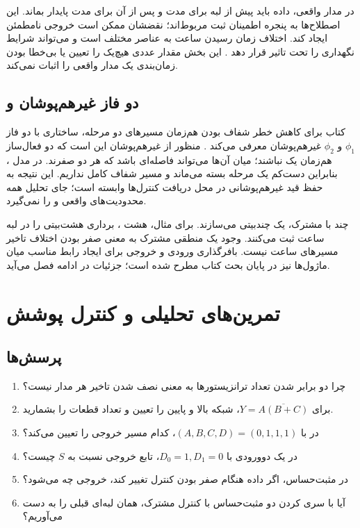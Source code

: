 در مدار واقعی، داده باید پیش از لبه برای مدت  و پس از آن برای
مدت  پایدار بماند. این اصطلاح‌ها به پنجره اطمینان ثبت مربوط‌اند؛
نقضشان ممکن است خروجی نامطمئن ایجاد کند.
 اختلاف زمان رسیدن ساعت به عناصر مختلف است و می‌تواند
شرایط نگهداری را تحت تاثیر قرار دهد \cite[ابتدای صفحه چاپی ۱۹]{weste}.
این بخش مقدار عددی هیچ‌یک را تعیین یا بی‌خطا بودن زمان‌بندی یک مدار واقعی را اثبات نمی‌کند.

\subsection{دو فاز غیرهم‌پوشان و }
کتاب برای کاهش خطر شفاف بودن هم‌زمان مسیرهای دو مرحله، ساختاری با دو فاز
\(\phi_1\) و \(\phi_2\) غیرهم‌پوشان معرفی می‌کند
\cite[شکل ]{weste}.
منظور از غیرهم‌پوشان این است که دو فعال‌ساز هم‌زمان یک نباشند؛
میان آن‌ها می‌تواند فاصله‌ای باشد که هر دو صفرند.
در مدل ، بنابراین دست‌کم یک مرحله بسته می‌ماند و مسیر شفاف کامل نداریم.
این نتیجه به حفظ قید غیرهم‌پوشانی در محل دریافت کنترل‌ها وابسته است؛
جای تحلیل همه محدودیت‌های واقعی و  را نمی‌گیرد.

چند  با  مشترک، یک  چندبیتی می‌سازند.
برای مثال، هشت ، برداری هشت‌بیتی را در لبه ساعت ثبت می‌کنند.
وجود یک  منطقی مشترک به معنی صفر بودن اختلاف تاخیر مسیرهای ساعت نیست.
بافرگذاری ورودی و خروجی برای ایجاد رابط مناسب میان ماژول‌ها نیز در پایان
بحث کتاب مطرح شده است؛ جزئیات  در ادامه فصل می‌آید.

\section{تمرین‌های تحلیلی و کنترل پوشش}
\subsection{پرسش‌ها}
\begin{enumerate}
\item چرا دو برابر شدن تعداد ترانزیستورها به معنی نصف شدن تاخیر هر مدار نیست؟
\item برای \(Y=\overline{A(B+C)}\)، شبکه بالا و پایین را تعیین و تعداد قطعات را بشمارید.
\item در  با \((A,B,C,D)=(0,1,1,1)\)، کدام مسیر خروجی را تعیین می‌کند؟
\item در یک  دوورودی با \(D_0=1,D_1=0\)، تابع خروجی نسبت به \(S\) چیست؟
\item در  مثبت‌حساس، اگر داده هنگام صفر بودن کنترل تغییر کند، خروجی چه می‌شود؟
\item آیا با سری کردن دو  مثبت‌حساس با کنترل مشترک،
همان  لبه‌ای قبلی را به دست می‌آوریم؟
\end{enumerate}

